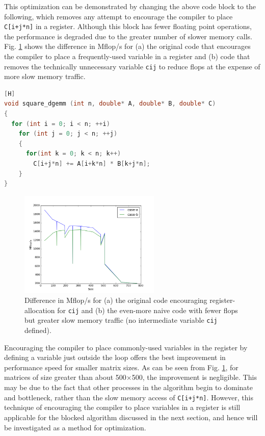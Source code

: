 \documentclass[10pt]{article}
\begin{document}
This optimization can be demonstrated by changing the above code block to the following, which removes any attempt to encourage the compiler to place {\tt C[i+j*n]} in a register. Although this block has fewer floating point operations, the performance is degraded due to the greater number of slower memory calls. Fig. \ref{fig:1} shows the difference in Mflop/s for (a) the original code that encourages the compiler to place a frequently-used variable in a register and (b) code that removes the technically unnecessary variable {\tt cij} to reduce flops at the expense of more slow memory traffic.

\begin{lstlisting}[language=C][H]
void square_dgemm (int n, double* A, double* B, double* C)
{
  for (int i = 0; i < n; ++i)
    for (int j = 0; j < n; ++j)
    {
      for(int k = 0; k < n; k++)
        C[i+j*n] += A[i+k*n] * B[k+j*n];
    }
}
\end{lstlisting}

\begin{figure}[H]
\centering
\includegraphics[width=0.6\textwidth]{figures/fig1.png}
\caption{Difference in Mflop/s for (a) the original code encouraging register-allocation for {\tt cij} and (b) the even-more naive code with fewer flops but greater slow memory traffic (no intermediate variable {\tt cij} defined).}
\label{fig:1}
\end{figure}

Encouraging the compiler to place commonly-used variables in the register by defining a variable just outside the loop offers the best improvement in performance speed for smaller matrix sizes. As can be seen from Fig. \ref{fig:1}, for matrices of size greater than about 500\(\times\)500, the improvement is negligible. This may be due to the fact that other processes in the algorithm begin to dominate and bottleneck, rather than the slow memory access of {\tt C[i+j*n]}. However, this technique of encouraging the compiler to place variables in a register is still applicable for the blocked algorithm discussed in the next section, and hence will be investigated as a method for optimization.
\end{document}
